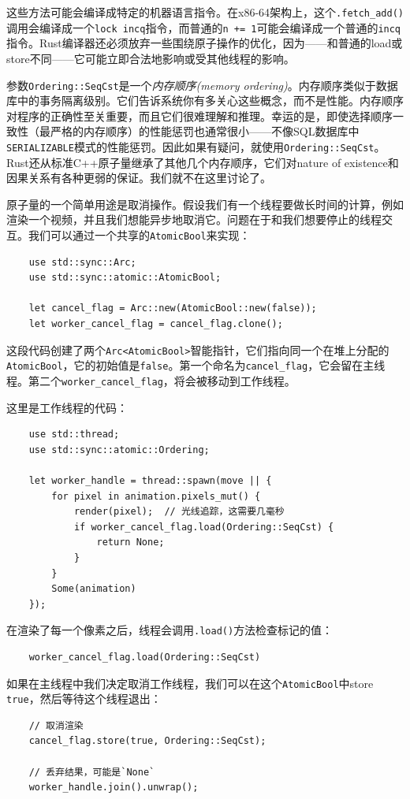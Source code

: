 这些方法可能会编译成特定的机器语言指令。在x86-64架构上，这个\texttt{.fetch\_add()}调用会编译成一个\texttt{lock incq}指令，而普通的\texttt{n += 1}可能会编译成一个普通的\texttt{incq}指令。Rust编译器还必须放弃一些围绕原子操作的优化，因为——和普通的load或store不同——它可能立即合法地影响或受其他线程的影响。 

参数\texttt{Ordering::SeqCst}是一个\emph{内存顺序(memory ordering)}。内存顺序类似于数据库中的事务隔离级别。它们告诉系统你有多关心这些概念，而不是性能。内存顺序对程序的正确性至关重要，而且它们很难理解和推理。幸运的是，即使选择顺序一致性（最严格的内存顺序）的性能惩罚也通常很小——不像SQL数据库中\texttt{SERIALIZABLE}模式的性能惩罚。因此如果有疑问，就使用\texttt{Ordering::SeqCst}。Rust还从标准C++原子量继承了其他几个内存顺序，它们对nature of existence和因果关系有各种更弱的保证。我们就不在这里讨论了。

原子量的一个简单用途是取消操作。假设我们有一个线程要做长时间的计算，例如渲染一个视频，并且我们想能异步地取消它。问题在于和我们想要停止的线程交互。我们可以通过一个共享的\texttt{AtomicBool}来实现：
\begin{verbatim}
    use std::sync::Arc;
    use std::sync::atomic::AtomicBool;

    let cancel_flag = Arc::new(AtomicBool::new(false));
    let worker_cancel_flag = cancel_flag.clone();
\end{verbatim}

这段代码创建了两个\texttt{Arc<AtomicBool>}智能指针，它们指向同一个在堆上分配的\texttt{AtomicBool}，它的初始值是\texttt{false}。第一个命名为\texttt{cancel\_flag}，它会留在主线程。第二个\texttt{worker\_cancel\_flag}，将会被移动到工作线程。

这里是工作线程的代码：
\begin{verbatim}
    use std::thread;
    use std::sync::atomic::Ordering;

    let worker_handle = thread::spawn(move || {
        for pixel in animation.pixels_mut() {
            render(pixel);  // 光线追踪，这需要几毫秒
            if worker_cancel_flag.load(Ordering::SeqCst) {
                return None;
            }
        }
        Some(animation)
    });
\end{verbatim}

在渲染了每一个像素之后，线程会调用\texttt{.load()}方法检查标记的值：
\begin{verbatim}
    worker_cancel_flag.load(Ordering::SeqCst)
\end{verbatim}

如果在主线程中我们决定取消工作线程，我们可以在这个\texttt{AtomicBool}中store \texttt{true}，然后等待这个线程退出：
\begin{verbatim}
    // 取消渲染
    cancel_flag.store(true, Ordering::SeqCst);

    // 丢弃结果，可能是`None`
    worker_handle.join().unwrap();
\end{verbatim}


